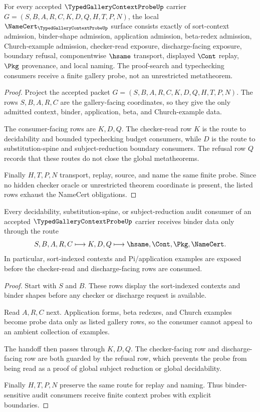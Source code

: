\begin{theorem}
\label{thm:typed-gallery-context-probe-namecert-obligations}
For every accepted $\TypedGalleryContextProbeUp$ carrier $G=(S,B,A,R,C,K,D,Q,H,T,P,N)$, the local $\NameCert_{\TypedGalleryContextProbeUp}$ surface consists exactly of sort-context admission, binder-shape admission, application admission, beta-redex admission, Church-example admission, checker-read exposure, discharge-facing exposure, boundary refusal, componentwise $\hsame$ transport, displayed $\Cont$ replay, $\Pkg$ provenance, and local naming. The proof-search and typechecking consumers receive a finite gallery probe, not an unrestricted metatheorem.
\end{theorem}
\begin{proof}
Project the accepted packet $G=(S,B,A,R,C,K,D,Q,H,T,P,N)$. The rows $S,B,A,R,C$ are the gallery-facing coordinates, so they give the only admitted context, binder, application, beta, and Church-example data.

The consumer-facing rows are $K,D,Q$. The checker-read row $K$ is the route to decidability and bounded typechecking budget consumers, while $D$ is the route to substitution-spine and subject-reduction boundary consumers. The refusal row $Q$ records that these routes do not close the global metatheorems.

Finally $H,T,P,N$ transport, replay, source, and name the same finite probe. Since no hidden checker oracle or unrestricted theorem coordinate is present, the listed rows exhaust the NameCert obligations.
\end{proof}

\begin{theorem}
\label{thm:typed-gallery-context-probe-binder-handoff}
Every decidability, substitution-spine, or subject-reduction audit consumer of an accepted $\TypedGalleryContextProbeUp$ carrier receives binder data only through the route
$$
S,B,A,R,C
\longmapsto
K,D,Q
\longmapsto
\hsame,\Cont,\Pkg,\NameCert .
$$
In particular, sort-indexed contexts and Pi/application examples are exposed before the checker-read and discharge-facing rows are consumed.
\end{theorem}
\begin{proof}
Start with $S$ and $B$. These rows display the sort-indexed contexts and binder shapes before any checker or discharge request is available.

Read $A,R,C$ next. Application forms, beta redexes, and Church examples become probe data only as listed gallery rows, so the consumer cannot appeal to an ambient collection of examples.

The handoff then passes through $K,D,Q$. The checker-facing row and discharge-facing row are both guarded by the refusal row, which prevents the probe from being read as a proof of global subject reduction or global decidability.

Finally $H,T,P,N$ preserve the same route for replay and naming. Thus binder-sensitive audit consumers receive finite context probes with explicit boundaries.
\end{proof}


